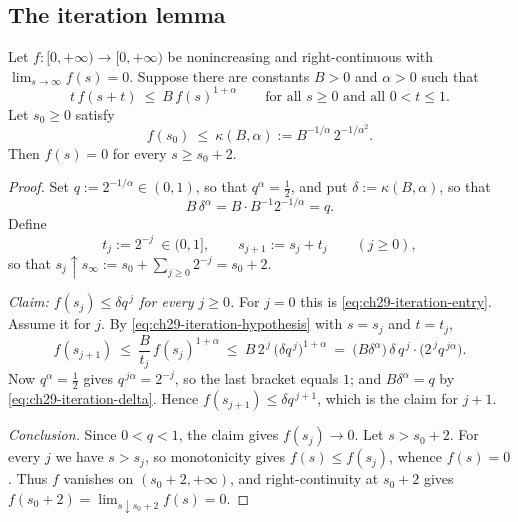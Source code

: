 \subsection{The iteration lemma}
\label{sec:ch29-iteration-lemma}

\begin{lemma}
\label{lem:ch29-iteration}
Let \(f:[0,+\infty)\to[0,+\infty)\) be nonincreasing and right-continuous
with \(\lim_{s\to\infty}f(s)=0\).  Suppose there are constants \(B>0\) and
\(\alpha>0\) such that
\begin{equation}
\label{eq:ch29-iteration-hypothesis}
 t\,f(s+t)\ \leq\ B\,f(s)^{1+\alpha}
 \qquad\text{for all }s\geq0\text{ and all }0<t\leq1 .
\end{equation}
Let \(s_0\geq0\) satisfy
\begin{equation}
\label{eq:ch29-iteration-entry}
 f(s_0)\ \leq\ \kappa(B,\alpha):=B^{-1/\alpha}\,2^{-1/\alpha^2}.
\end{equation}
Then \(f(s)=0\) for every \(s\geq s_0+2\).
\end{lemma}

\begin{proof}
Set \(q:=2^{-1/\alpha}\in(0,1)\), so that \(q^\alpha=\tfrac12\), and put
\(\delta:=\kappa(B,\alpha)\), so that
\begin{equation}
\label{eq:ch29-iteration-delta}
 B\,\delta^\alpha=B\cdot B^{-1}2^{-1/\alpha}=q .
\end{equation}
Define
\[
 t_j:=2^{-j}\ \in(0,1],\qquad
 s_{j+1}:=s_j+t_j\qquad(j\geq0),
\]
so that \(s_j\uparrow s_\infty:=s_0+\sum_{j\geq0}2^{-j}=s_0+2\).

\emph{Claim: \(f(s_j)\leq\delta q^{\,j}\) for every \(j\geq0\).}  For
\(j=0\) this is \eqref{eq:ch29-iteration-entry}.  Assume it for \(j\).  By
\eqref{eq:ch29-iteration-hypothesis} with \(s=s_j\) and \(t=t_j\),
\[
 f(s_{j+1})\ \leq\ \frac{B}{t_j}\,f(s_j)^{1+\alpha}
 \ \leq\ B\,2^{\,j}\,\bigl(\delta q^{\,j}\bigr)^{1+\alpha}
 \ =\ \bigl(B\delta^{\alpha}\bigr)\,\delta\,
       q^{\,j}\cdot\bigl(2^{\,j}q^{\,j\alpha}\bigr).
\]
Now \(q^{\alpha}=\tfrac12\) gives \(q^{\,j\alpha}=2^{-j}\), so the last
bracket equals \(1\); and \(B\delta^\alpha=q\) by
\eqref{eq:ch29-iteration-delta}.  Hence
\(f(s_{j+1})\leq\delta q^{\,j+1}\), which is the claim for \(j+1\).

\emph{Conclusion.}  Since \(0<q<1\), the claim gives \(f(s_j)\to0\).  Let
\(s>s_0+2\).  For every \(j\) we have \(s>s_j\), so monotonicity gives
\(f(s)\leq f(s_j)\), whence \(f(s)=0\).  Thus \(f\) vanishes on
\((s_0+2,+\infty)\), and right-continuity at \(s_0+2\) gives
\(f(s_0+2)=\lim_{s\downarrow s_0+2}f(s)=0\).
\end{proof}

